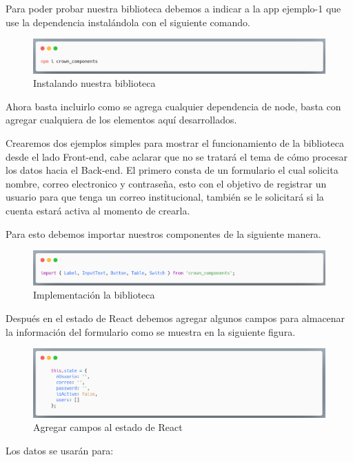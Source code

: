 Para poder probar nuestra biblioteca debemos a indicar a la app ejemplo-1 que use la dependencia instalándola con el siguiente comando.\newline
\newline
\begin{figure}[H]
    \includegraphics[width=1\textwidth]{./Imagenes/9.4}
   \centering 
    \caption[Instalando nuestra biblioteca]{Instalando nuestra biblioteca}
    \end{figure}
\newline

Ahora basta incluirlo como se agrega cualquier dependencia de node, basta con agregar cualquiera de los elementos aquí desarrollados. 

Crearemos dos ejemplos simples para mostrar el funcionamiento de la biblioteca desde el lado Front-end, cabe aclarar que no se tratará el tema de cómo procesar los datos hacia el Back-end.
El primero consta de un formulario el cual solicita nombre, correo electronico y contraseña, esto con el objetivo de registrar un usuario para que tenga un correo institucional, también se le solicitará si la cuenta estará activa al momento de crearla.

Para esto debemos importar nuestros componentes de la siguiente manera.
\newline
\begin{figure}[H]
    \includegraphics[width=1\textwidth]{./Imagenes/9.6}
   \centering 
    \caption[Implementación la biblioteca]{Implementación la biblioteca}
    \end{figure}
\newline

Después en el estado de React debemos agregar algunos campos para almacenar la información del formulario como se muestra en la siguiente figura.
\newline
\begin{figure}[H]
    \includegraphics[width=1\textwidth]{./Imagenes/9.7}
   \centering 
    \caption[Agregar campos al estado de React]{Agregar campos al estado de React}
    \end{figure}
\newline
Los datos se usarán para:

